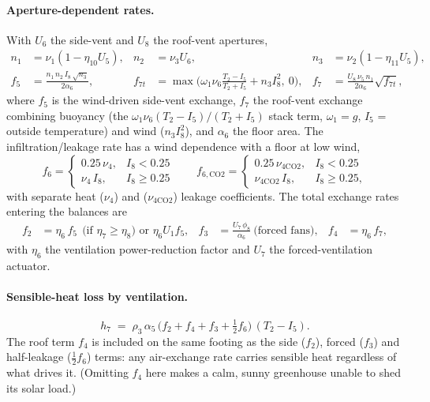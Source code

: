 \documentclass[11pt,a4paper]{article}
\newcommand{\Tair}{T_{2}}
\begin{document}
\paragraph{Aperture-dependent rates.} With $U_6$ the side-vent and $U_8$ the roof-vent apertures,
\begin{align}
  n_1 &= \nu_1(1-\eta_{10}U_5), & n_2 &= \nu_3 U_6, & n_3 &= \nu_2(1-\eta_{11}U_5),\\
  f_5 &= \frac{n_1\,n_2\,I_8\,\sqrt{n_3}}{2\alpha_6}, &
  f_{7t} &= \max\!\Big(\omega_1\nu_6\frac{\Tair-I_5}{\Tair+I_5} + n_3 I_8^2,\ 0\Big), &
  f_7 &= \frac{U_8\,\nu_5\,n_1}{2\alpha_6}\sqrt{f_{7t}},
\end{align}
where $f_5$ is the wind-driven side-vent exchange, $f_7$ the roof-vent exchange combining buoyancy
(the $\omega_1\nu_6(\Tair-I_5)/(\Tair+I_5)$ stack term, $\omega_1=g$, $I_5$ = outside temperature)
and wind ($n_3 I_8^2$), and $\alpha_6$ the floor area. The infiltration/leakage rate has a wind
dependence with a floor at low wind,
\begin{equation}
  f_6 = \begin{cases} 0.25\,\nu_4, & I_8<0.25\\ \nu_4\,I_8, & I_8\ge0.25\end{cases}
  \qquad
  f_{6,\text{CO2}} = \begin{cases} 0.25\,\nu_{4\text{CO2}}, & I_8<0.25\\ \nu_{4\text{CO2}}\,I_8, & I_8\ge0.25,\end{cases}
\end{equation}
with separate heat ($\nu_4$) and  ($\nu_{4\text{CO2}}$) leakage coefficients. The total
exchange rates entering the balances are
\begin{align}
  f_2 &= \eta_6\,f_5 \ \ \text{(if } \eta_7\ge\eta_8\text{) or } \eta_6 U_1 f_5, &
  f_3 &= \frac{U_7\,\phi_8}{\alpha_6}\ \text{(forced fans)}, &
  f_4 &= \eta_6\,f_7,
\end{align}
with $\eta_6$ the ventilation power-reduction factor and $U_7$ the forced-ventilation actuator.

\paragraph{Sensible-heat loss by ventilation.}
\begin{equation}
  h_7 \;=\; \rho_3\,\alpha_5\,\big(f_2 + f_4 + f_3 + \tfrac12 f_6\big)\,(\Tair - I_5).
\end{equation}
The roof term $f_4$ is included on the same footing as the side ($f_2$), forced ($f_3$) and
half-leakage ($\tfrac12 f_6$) terms: any air-exchange rate carries sensible heat regardless of what
drives it. (Omitting $f_4$ here makes a calm, sunny greenhouse unable to shed its solar load.)
\end{document}
